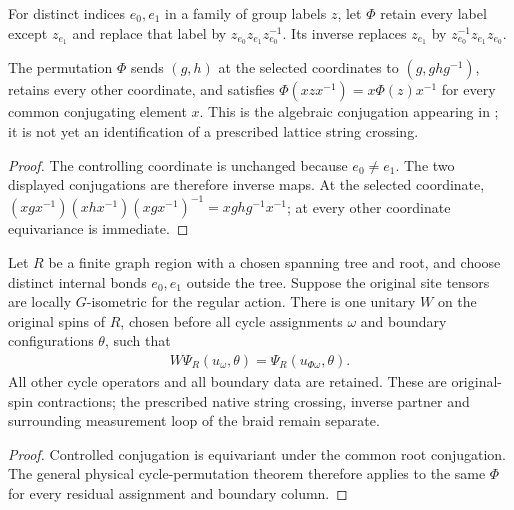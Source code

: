 \begin{definition}%
    \label{def:peps_regular_two_cycle_conjugation}
    \leanok
    For distinct indices $e_0,e_1$ in a family of group labels $z$, let
    $\Phi$ retain every label except $z_{e_1}$ and replace that label by
    $z_{e_0}z_{e_1}z_{e_0}^{-1}$. Its inverse replaces $z_{e_1}$ by
    $z_{e_0}^{-1}z_{e_1}z_{e_0}$.
\end{definition}

\begin{lemma}%
    \label{thm:peps_regular_two_cycle_conjugation}
    \leanok
    The permutation $\Phi$ sends $(g,h)$ at the selected coordinates to
    $(g,ghg^{-1})$, retains every other coordinate, and satisfies
    $\Phi(xzx^{-1})=x\Phi(z)x^{-1}$ for every common conjugating element $x$.
    This is the algebraic conjugation appearing in
    \cite[Section 6.6, fluxon braiding]{Schuch2010PEPS}; it is not yet an
    identification of a prescribed lattice string crossing.
\end{lemma}
\begin{proof}\leanok
    The controlling coordinate is unchanged because $e_0\ne e_1$.
    The two displayed conjugations are therefore inverse maps.
    At the selected coordinate,
    $(xgx^{-1})(xhx^{-1})(xgx^{-1})^{-1}=xghg^{-1}x^{-1}$;
    at every other coordinate equivariance is immediate.
\end{proof}

\begin{lemma}%
    \label{thm:peps_regular_two_cycle_conjugation_physical}
    \leanok
    Let $R$ be a finite graph region with a chosen spanning tree and root, and
    choose distinct internal bonds $e_0,e_1$ outside the tree. Suppose the
    original site tensors are locally $G$-isometric for the regular action.
    There is one unitary $W$ on the original spins of $R$, chosen before all
    cycle assignments $\omega$ and boundary configurations $\theta$, such that
    \begin{align}
        W\Psi_R(u_\omega,\theta)=\Psi_R(u_{\Phi\omega},\theta).
    \end{align}
    All other cycle operators and all boundary data are retained. These are
    original-spin contractions; the prescribed native string crossing, inverse partner
    and surrounding measurement loop of the braid remain separate.
\end{lemma}
\begin{proof}\leanok
    Controlled conjugation is equivariant under the common root conjugation.
    The general physical cycle-permutation theorem therefore applies to the
    same $\Phi$ for every residual assignment and boundary column.
\end{proof}
